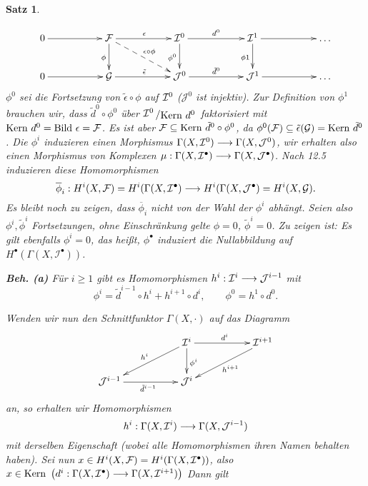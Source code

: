 \documentclass[11pt]{book}
\newtheorem{theorem}{Satz}[section]
\theoremstyle{nonumberbreak}
\newenvironment{pr}[1][]{\ifthenelse{\equal{#1}{}}{\proof}{\proof[#1]}\rm}{\endproof}
\newcommand{\bild}{\mathrm{Bild}\ }
\newcommand{\kernel}{\mathrm{Kern}\ }
\newcommand{\slant}[2]{{\raisebox{.1em}{$#1$}\left/\raisebox{-.1em}{$#2$}\right.}}
\begin{document}
\begin{spacing}{1.4}
\begin{theorem}
\begin{pr}
\begin{compactenum}
$$
\begin{xy}
\xymatrix{
0 \ar[rr] && \F \ar[d]_{\phi} \ar[rr]^{\epsilon} \ar@{-->}[rrd]^{{\epsilon} \circ \phi} && \mathcal{I}^{0} \ar[d]_{\phi^0} \ar[rr]^{d^{0}} && \I^{1} \ar[d]_{\phi1} \ar[rr] && \ldots \\
0 \ar[rr] && \G \ar[rr]^{\tilde{\epsilon}} && \mathcal{J}^{0} \ar[rr]^{\tilde{d}^{0}} && \mathcal{J}^{1} \ar[rr] && \ldots
}
\end{xy}
$$
$\phi^{0}$ sei die Fortsetzung von $\tilde{\epsilon} \circ \phi$ auf $\mathcal{I}^{0}$ ($\mathcal{J}^{0}$ ist injektiv). Zur Definition von $\phi^{1}$ brauchen wir, dass $\tilde{d}^{0} \circ \phi^{0}$ über $\slant{\I^{0}}{\kernel d^{0}}$ faktorisiert mit $\kernel d^{0} = \bild \epsilon = \F$. Es ist aber $\F \subseteq \kernel \tilde{d}^{0} \circ \phi^{0}$, da $\phi^{0}(\F) \subseteq \tilde{\epsilon}(\G) = \kernel \tilde{d}^{0}$. Die $\phi^{i}$ induzieren einen Morphismus $\Gamma(X, \mathcal{I}^{0}) \longrightarrow \Gamma(X, \mathcal{J}^{0})$, wir erhalten also einen Morphismus von Komplexen $\mu: \Gamma(X, \mathcal{I}^{\bullet}) \longrightarrow \Gamma(X, \mathcal{J}^{\bullet})$. Nach 12.5 induzieren diese Homomorphismen
$$\overline{\phi}_{i}: H^{i}(X, \mathcal{F}) = H^{i}(\Gamma(X, \mathcal{I}^{\bullet}) \longrightarrow H^{i}(\Gamma(X, \mathcal{J}^{\bullet}) = H^{i}(X, \mathcal{G}).$$
Es bleibt noch zu zeigen, dass $\overline{\phi}_i$ nicht von der Wahl der $\phi^{i}$ abhängt. Seien also $\phi^{i}, \tilde{\phi}^{i}$ Fortsetzungen, ohne Einschränkung gelte $\phi=0$, $\tilde{\phi}^{i} =0$. Zu zeigen ist: Es gilt ebenfalls $\phi^{i}=0$, das heißt, $\phi^{\bullet}$ induziert die Nullabbildung auf $H^{\bullet}(\Gamma(X, \mathcal{I}^{\bullet}))$. 
\begin{compactenum}
\item[\textbf{Beh. (a)}] Für $i \geqslant 1$ gibt es Homomorphismen $h^{i}: \mathcal{I}^{i} \longrightarrow \mathcal{J}^{i-1}$ mit
$$\phi^{i} = \tilde{d}^{i-1} \circ h^{i} + h^{i+1} \circ d^{i}, \qquad \phi^{0} = h^{1} \circ d^{0}.$$\end{compactenum}
Wenden wir nun den Schnittfunktor $\Gamma(X, \cdot)$ auf das Diagramm
$$
\begin{xy}
\xymatrix{
&& \I^{i} \ar[lld]_{h^{i}} \ar[d]^{\phi^{i}} \ar[rr]^{d^{i}} && \I^{i+1} \ar[lld]^{h^{i+1}} \\ \mathcal{J}^{i-1} \ar[rr]_{\tilde{d}^{i-1}} && \mathcal{J}^{i} &&
}
\end{xy}
$$
an, so erhalten wir Homomorphismen 
$$h^{i}: \Gamma(X, \mathcal{I}^{i}) \longrightarrow \Gamma(X, \mathcal{J}^{i-1})$$
mit derselben Eigenschaft (wobei alle Homomorphismen ihren Namen behalten haben). Sei nun $x \in H^{i}(X, \mathcal{F}) = H^{i}(\Gamma(X, \mathcal{I}^{\bullet}))$, also $x \in \kernel \left( d^{i}: \Gamma(X, \I^{\bullet}) \la \Gamma(X, \I^{i+1}) \right)$ Dann gilt 

\end{compactenum}
\end{pr}
\end{theorem}
\end{spacing}
\end{document}
